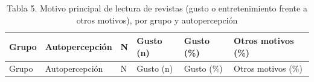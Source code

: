 \documentclass[
  spanish,
  12pt,
]{extarticle}
\begin{document}
\begin{longtable}[]{@{}
  >{\raggedright\arraybackslash}p{}
  >{\raggedright\arraybackslash}p{}
  >{\raggedleft\arraybackslash}p{}
  >{\raggedleft\arraybackslash}p{}
  >{\raggedleft\arraybackslash}p{}
  >{\raggedleft\arraybackslash}p{}@{}}
\caption{Tabla 5. Motivo principal de lectura de revistas (gusto o
entretenimiento frente a otros motivos), por grupo y
autopercepción}\tabularnewline
\toprule\noalign{}
\begin{minipage}[b]{\linewidth}\raggedright
Grupo
\end{minipage} & \begin{minipage}[b]{\linewidth}\raggedright
Autopercepción
\end{minipage} & \begin{minipage}[b]{\linewidth}\raggedleft
N
\end{minipage} & \begin{minipage}[b]{\linewidth}\raggedleft
Gusto (n)
\end{minipage} & \begin{minipage}[b]{\linewidth}\raggedleft
Gusto (\%)
\end{minipage} & \begin{minipage}[b]{\linewidth}\raggedleft
Otros motivos (\%)
\end{minipage} \\
\midrule\noalign{}
\endfirsthead
\toprule\noalign{}
\begin{minipage}[b]{\linewidth}\raggedright
Grupo
\end{minipage} & \begin{minipage}[b]{\linewidth}\raggedright
Autopercepción
\end{minipage} & \begin{minipage}[b]{\linewidth}\raggedleft
N
\end{minipage} & \begin{minipage}[b]{\linewidth}\raggedleft
Gusto (n)
\end{minipage} & \begin{minipage}[b]{\linewidth}\raggedleft
Gusto (\%)
\end{minipage} & \begin{minipage}[b]{\linewidth}\raggedleft
Otros motivos (\%)
\end{minipage} \\

\end{longtable}
\end{document}
